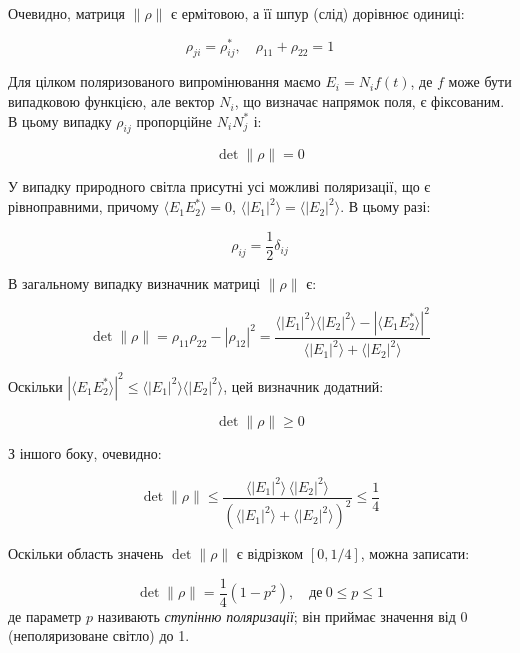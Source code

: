 Очевидно, матриця \( \|\rho\|\) є ермітовою, а її шпур (слід) дорівнює одиниці:

\begin{equation}\label{eq:hermitian}
\rho_{ji} = \rho_{ij}^{*}, \quad \rho_{11} + \rho_{22} = 1
\end{equation}

Для цілком поляризованого випромінювання маємо \(E_i = N_i f(t)\), де \(f\) може бути випадковою функцією, але вектор \(N_i\), що визначає напрямок
поля, є фіксованим. В цьому випадку \(\rho_{ij}\) пропорційне \(N_i N_j^{*}\) і:

\begin{equation}
\det \|\rho\| = 0
\end{equation}

У випадку природного світла присутні усі можливі поляризації, що є рівноправними, причому \(\langle E_1 E_2^{*} \rangle = 0\), \(\langle |E_1|^2 \rangle =
\langle |E_2|^2 \rangle\). В цьому разі:

\begin{equation*}
\rho_{ij} = \frac{1}{2} \delta_{ij}
\end{equation*}

В загальному випадку визначник матриці \(\|\rho\|\) є:

\begin{equation*}
\det \|\rho\| = \rho_{11} \rho_{22} - |\rho_{12}|^2 = \frac{\langle |E_1|^2 \rangle \langle |E_2|^2 \rangle - |\langle E_1 E_2^{*} \rangle|^2}{
\langle |E_1|^2 \rangle + \langle |E_2|^2 \rangle}
\end{equation*}

Оскільки \(|\langle E_1 E_2^{*} \rangle|^2 \leqslant  \langle |E_1|^2 \rangle \langle |E_2|^2 \rangle\), цей визначник додатний:

\begin{equation*}
\det \|\rho\| \geqslant 0
\end{equation*}

З іншого боку, очевидно:

\begin{equation*}
\det \|\rho\| \leqslant
\frac{\langle |E_1|^2 \rangle \, \langle |E_2|^2 \rangle}
{\left(\langle |E_1|^2 \rangle + \langle |E_2|^2 \rangle\right)^2}
\leqslant \frac{1}{4}
\end{equation*}

Оскільки область значень \(\det \|\rho\| \) є відрізком \([0, 1/4]\), можна записати:

\begin{equation}
\det \|\rho\| = \frac{1}{4} \left( 1 - p^2 \right),\quad  \text{де}\  0 \leqslant  p \leqslant 1
\label{eq:polarization_degree}
\end{equation}
%
де параметр \(p\) називають \emph{ступінню поляризації}; він приймає значення від 0 (неполяризоване світло) до 1.


